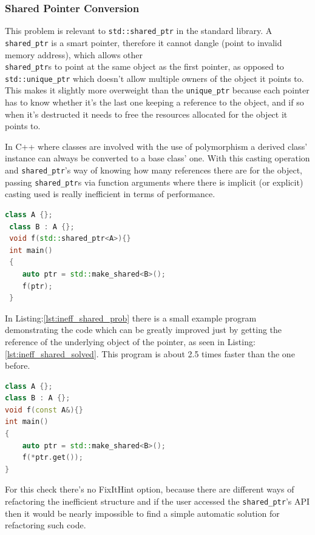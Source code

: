  \subsubsection{Shared Pointer Conversion}
 \par This problem is relevant to \verb|std::shared_ptr| in the standard library. A \verb|shared_ptr| is a smart pointer, therefore it cannot dangle (point to invalid memory address), which allows other \\\verb|shared_ptr|s to point at the same object as the first pointer, as opposed to \verb|std::unique_ptr| which doesn't allow multiple owners of the object it points to. This makes it slightly more overweight than the \verb|unique_ptr| because each pointer has to know whether it's the last one keeping a reference to the object, and if so when it's destructed it needs to free the resources allocated for the object it points to. \medskip
 \par In C++ where classes are involved with the use of polymorphism a derived class' instance can always be converted to a base class' one. With this casting operation and \verb|shared_ptr|'s way of knowing how many references there are for the object, passing \verb|shared_ptr|s via function arguments where there is implicit (or explicit) casting used is really inefficient in terms of performance. \medskip
 \begin{lstlisting}[language=c++, frame=single ,caption={Inefficient implicit cast}, label={lst:ineff_shared_prob}]
 class A {};
 class B : A {};
 void f(std::shared_ptr<A>){}
 int main()
 {
 	auto ptr = std::make_shared<B>();
 	f(ptr);
 } 
\end{lstlisting}
\par In Listing:\ref{lst:ineff_shared_prob} there is a small example program demonstrating the code which can be greatly improved just by getting the reference of the underlying object of the pointer, as seen in Listing:\ref{lst:ineff_shared_solved}. This program is about 2.5 times faster than the one before. 
\begin{lstlisting}[language=c++, frame=single ,caption={A much faster version}, label={lst:ineff_shared_solved}]
class A {};
class B : A {};
void f(const A&){}
int main()
{
	auto ptr = std::make_shared<B>();
	f(*ptr.get());
}
\end{lstlisting}
\par For this check there's no FixItHint option, because there are different ways of refactoring the inefficient structure and if the user accessed the \verb|shared_ptr|'s API then it would be nearly impossible to find a simple automatic solution for refactoring such code. 
